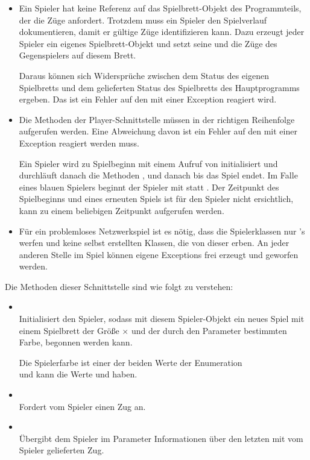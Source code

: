 \begin{enumerate}
\begin{itemize}
\item Ein Spieler hat keine Referenz auf das Spielbrett-Objekt des Programmteils, der die Züge anfordert. Trotzdem muss ein Spieler den Spielverlauf dokumentieren, damit er gültige Züge identifizieren kann. Dazu erzeugt jeder Spieler ein eigenes Spielbrett-Objekt und setzt seine und die Züge des Gegenspielers auf diesem Brett.

Daraus können sich Widersprüche zwischen dem Status des eigenen Spielbretts und dem gelieferten Status des Spielbretts des Hauptprogramms ergeben. Das ist ein Fehler auf den mit einer Exception reagiert wird.

\item Die Methoden der Player-Schnittstelle müssen in der richtigen Reihenfolge aufgerufen werden. Eine Abweichung davon ist ein Fehler auf den mit einer Exception reagiert werden muss.

Ein Spieler wird zu Spielbeginn mit einem Aufruf von  initialisiert und durchläuft danach die Methoden ,  und danach  bis das Spiel endet. Im Falle eines blauen Spielers beginnt der Spieler mit  statt . Der Zeitpunkt des Spielbeginns und eines erneuten Spiels ist für den Spieler nicht ersichtlich,  kann zu einem beliebigen Zeitpunkt aufgerufen werden.


\item Für ein problemloses Netzwerkspiel ist es nötig, dass die Spielerklassen nur 's werfen und keine selbst erstellten Klassen, die von dieser erben. An jeder anderen Stelle im Spiel können eigene Exceptions frei erzeugt und geworfen werden.
\end{itemize}

\newpage
Die Methoden dieser Schnittstelle sind wie folgt zu verstehen:

\begin{itemize}[leftmargin=4em]
\item[\code{init}] \hfill \\Initialisiert den Spieler, sodass mit diesem Spieler-Objekt ein neues Spiel mit einem Spielbrett der Größe  $\times$  und der durch den Parameter  bestimmten Farbe, begonnen werden kann.

Die Spielerfarbe ist einer der beiden Werte der Enumeration \\
 und kann die Werte  und  haben.
\item[\code{request}] \hfill \\Fordert vom Spieler einen Zug an.
\item[\code{confirm}] \hfill \\Übergibt dem Spieler im Parameter  Informationen über den letzten mit  vom Spieler gelieferten Zug.


\end{itemize}
\end{enumerate}
